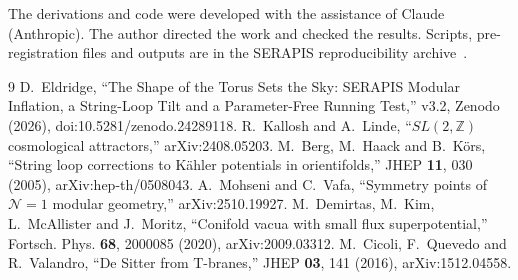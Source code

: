 \documentclass[aps,prd,twocolumn,superscriptaddress,nofootinbib,showkeys]{revtex4-2}
\begin{document}
\begin{acknowledgments}
The derivations and code were developed with the assistance of Claude (Anthropic). The author directed the work and checked the results. Scripts, pre-registration files and outputs are in the SERAPIS reproducibility archive~\cite{SERAPIS}.
\end{acknowledgments}

\begin{thebibliography}{9}
 D.~Eldridge, ``The Shape of the Torus Sets the Sky: SERAPIS Modular Inflation, a String-Loop Tilt and a Parameter-Free Running Test,'' v3.2, Zenodo (2026), doi:10.5281/zenodo.24289118.
 R.~Kallosh and A.~Linde, ``$SL(2,\mathbb{Z})$ cosmological attractors,'' arXiv:2408.05203.
 M.~Berg, M.~Haack and B.~K\"ors, ``String loop corrections to K\"ahler potentials in orientifolds,'' JHEP \textbf{11}, 030 (2005), arXiv:hep-th/0508043.
 A.~Mohseni and C.~Vafa, ``Symmetry points of $\mathcal{N}=1$ modular geometry,'' arXiv:2510.19927.
 M.~Demirtas, M.~Kim, L.~McAllister and J.~Moritz, ``Conifold vacua with small flux superpotential,'' Fortsch. Phys. \textbf{68}, 2000085 (2020), arXiv:2009.03312.
 M.~Cicoli, F.~Quevedo and R.~Valandro, ``De Sitter from T-branes,'' JHEP \textbf{03}, 141 (2016), arXiv:1512.04558.
\end{thebibliography}
\end{document}
